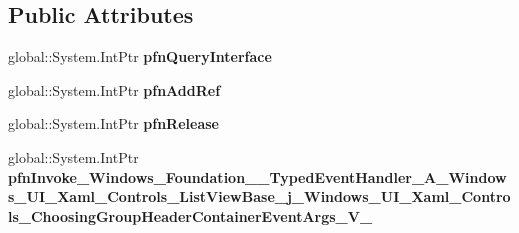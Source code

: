 \subsection*{Public Attributes}
\begin{DoxyCompactItemize}
\item 
\mbox{\label{struct_windows_1_1_foundation_1_1_typed_event_handler___a___windows___u_i___xaml___controls___li89c076cde303fbaf0fcbca1d0fe1cbb9_a8d89e8d466f7b61e9be23adf946c74a9}} 
global\+::\+System.\+Int\+Ptr {\bfseries pfn\+Query\+Interface}
\item 
\mbox{\label{struct_windows_1_1_foundation_1_1_typed_event_handler___a___windows___u_i___xaml___controls___li89c076cde303fbaf0fcbca1d0fe1cbb9_adf3773bab0414a1868592c7d3552ae03}} 
global\+::\+System.\+Int\+Ptr {\bfseries pfn\+Add\+Ref}
\item 
\mbox{\label{struct_windows_1_1_foundation_1_1_typed_event_handler___a___windows___u_i___xaml___controls___li89c076cde303fbaf0fcbca1d0fe1cbb9_a68f3dea3d474158ce561507c6b96cc19}} 
global\+::\+System.\+Int\+Ptr {\bfseries pfn\+Release}
\item 
\mbox{\label{struct_windows_1_1_foundation_1_1_typed_event_handler___a___windows___u_i___xaml___controls___li89c076cde303fbaf0fcbca1d0fe1cbb9_a969a55d28537089f43f6ed516c215828}} 
global\+::\+System.\+Int\+Ptr {\bfseries pfn\+Invoke\+\_\+\+Windows\+\_\+\+Foundation\+\_\+\+\_\+\+Typed\+Event\+Handler\+\_\+\+A\+\_\+\+Windows\+\_\+\+U\+I\+\_\+\+Xaml\+\_\+\+Controls\+\_\+\+List\+View\+Base\+\_\+j\+\_\+\+Windows\+\_\+\+U\+I\+\_\+\+Xaml\+\_\+\+Controls\+\_\+\+Choosing\+Group\+Header\+Container\+Event\+Args\+\_\+\+V\+\_\+}
\end{DoxyCompactItemize}
